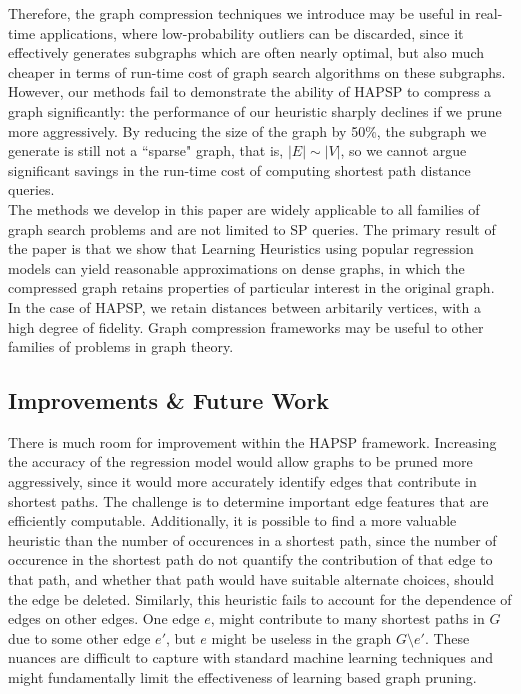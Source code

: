 \documentclass[10.5pt,journal]{IEEEtran}
\begin{document}
		Therefore, the graph compression techniques we introduce may be useful in real-time
		applications, where low-probability outliers can be discarded, since it effectively
		generates subgraphs which are often nearly optimal, but also much cheaper in terms
		of run-time cost of graph search algorithms on these subgraphs. \\
		
		However, our methods fail to demonstrate the ability of HAPSP to compress a graph 
		significantly: the performance of our heuristic sharply declines if we prune more aggressively.
		By reducing the size of the graph by 50$\%$, the subgraph we generate is still not a ``sparse"
		graph, that is, $|E| \sim |V|$, so we cannot argue significant savings in the run-time cost of
		computing shortest path distance queries. \\
		
		The methods we develop in this paper are widely applicable to all families of graph search
		problems and are not limited to SP queries. The primary result of the paper is that we
		show that Learning Heuristics using popular regression models can yield reasonable
		approximations on dense graphs, in which the compressed graph retains properties of
		particular interest in the original graph. In the case of HAPSP, we retain distances between
		arbitarily vertices, with a high degree of fidelity. Graph compression frameworks may be
		useful to other families of problems in graph theory.
	\subsection{Improvements \& Future Work}
		There is much room for improvement within the HAPSP framework. Increasing the accuracy of the
		regression model would allow graphs to be pruned more aggressively, since it would more
		accurately identify edges that contribute in shortest paths. The challenge is to determine
		important edge features that are efficiently computable. Additionally, it is possible to
		find a more valuable heuristic than the number of occurences in a shortest path, since
		the number of occurence in the shortest path do not quantify the contribution of that edge
		to that path, and whether that path would have suitable alternate choices, should the edge
		be deleted. Similarly, this heuristic fails to account for the dependence of edges on
		other edges. One edge $e$, might contribute to many shortest paths in $G$ due to some
		other edge $e'$, but $e$ might be useless in the graph $G\setminus e'$. These nuances
		are difficult to capture with standard machine learning techniques and might fundamentally
		limit the effectiveness of learning based graph pruning. \\
		
\end{document}
